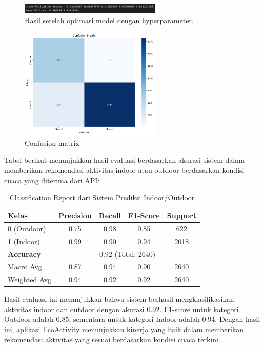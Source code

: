 \documentclass[journal,article,submit,pdftex,moreauthors]{Definitions/mdpi}
\begin{document}
\begin{figure}[H]
    \centering
    \includegraphics[width=0.6\textwidth]{Definitions/images/5.jpeg}
    \caption{Hasil setelah optimasi model dengan hyperparameter.}
\end{figure}
\begin{figure}[H]
    \centering
    \includegraphics[width=0.6\textwidth]{Definitions/images/7.jpeg}
    \caption{Confusion matrix}
    \label{fig:heatmap_confusion}
\end{figure}

Tabel berikut menunjukkan hasil evaluasi berdasarkan akurasi sistem dalam memberikan rekomendasi aktivitas indoor atau outdoor berdasarkan kondisi cuaca yang diterima dari API:

\begin{table}[h]
    \centering
    \caption{Classification Report dari Sistem Prediksi Indoor/Outdoor}
    \begin{tabular}{lcccc}
        \hline
        Kelas & Precision & Recall & F1-Score & Support \\
        \hline
        0 (Outdoor) & 0.75 & 0.98 & 0.85 & 622 \\
        1 (Indoor) & 0.99 & 0.90 & 0.94 & 2018 \\
        \hline
        \textbf{Accuracy} & \multicolumn{4}{c}{0.92 (Total: 2640)} \\
        Macro Avg & 0.87 & 0.94 & 0.90 & 2640 \\
        Weighted Avg & 0.94 & 0.92 & 0.92 & 2640 \\
        \hline
    \end{tabular}
    \label{tab:indoor-outdoor-classification}
\end{table}

Hasil evaluasi ini menunjukkan bahwa sistem berhasil mengklasifikasikan aktivitas indoor dan outdoor dengan akurasi 0.92. F1-score untuk kategori Outdoor adalah 0.85, sementara untuk kategori Indoor adalah 0.94. Dengan hasil ini, aplikasi EcoActivity menunjukkan kinerja yang baik dalam memberikan rekomendasi aktivitas yang sesuai berdasarkan kondisi cuaca terkini.
\end{document}
